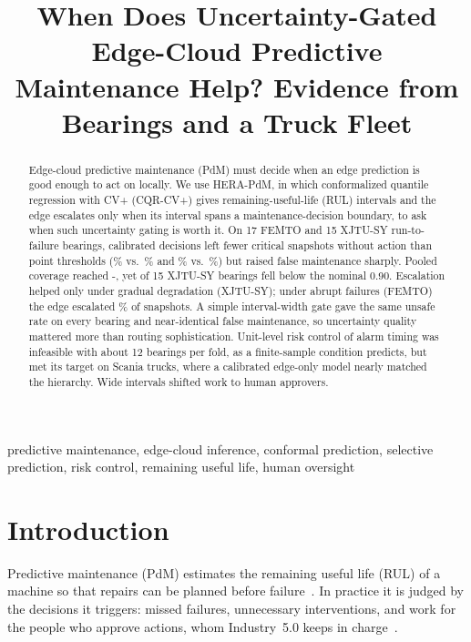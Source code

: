 \documentclass[conference]{IEEEtran}
\begin{document}
\title{When Does Uncertainty-Gated Edge-Cloud Predictive Maintenance Help? Evidence from Bearings and a Truck Fleet}

\author{
}

\maketitle

\begin{abstract}
Edge-cloud predictive maintenance (PdM) must decide when an edge prediction is good enough to act on locally. We use HERA-PdM, in which conformalized quantile regression with CV+ (CQR-CV+) gives remaining-useful-life (RUL) intervals and the edge escalates only when its interval spans a maintenance-decision boundary, to ask when such uncertainty gating is worth it. On 17 FEMTO and 15 XJTU-SY run-to-failure bearings, calibrated decisions left fewer critical snapshots without action than point thresholds (\feUnsafeHera\% vs.\ \feUnsafePoint\% and \xjUnsafeHera\% vs.\ \xjUnsafePoint\%) but raised false maintenance sharply. Pooled coverage reached \xjPicpCloud-\xjPicpEdge, yet \xjPbCovLow{} of 15 XJTU-SY bearings fell below the nominal 0.90. Escalation helped only under gradual degradation (XJTU-SY); under abrupt failures (FEMTO) the edge escalated \feEscHera\% of snapshots. A simple interval-width gate gave the same unsafe rate on every bearing and near-identical false maintenance, so uncertainty quality mattered more than routing sophistication. Unit-level risk control of alarm timing was infeasible with about 12 bearings per fold, as a finite-sample condition predicts, but met its target on \flN{} Scania trucks, where a calibrated edge-only model nearly matched the hierarchy. Wide intervals shifted work to human approvers.
\end{abstract}

\begin{IEEEkeywords}
predictive maintenance, edge-cloud inference, conformal prediction, selective prediction, risk control, remaining useful life, human oversight
\end{IEEEkeywords}

\section{Introduction}
Predictive maintenance (PdM) estimates the remaining useful life (RUL) of a machine so that repairs can be planned before failure~\cite{lei2018machinery}. In practice it is judged by the decisions it triggers: missed failures, unnecessary interventions, and work for the people who approve actions, whom Industry~5.0 keeps in charge~\cite{xu2021industry5,vanoudenhoven2023pdm5}.
\end{document}
